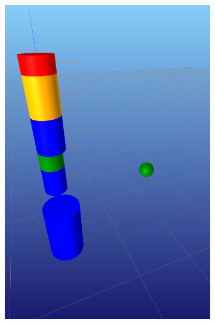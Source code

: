 \documentclass[conference]{IEEEtran}
\begin{document}
\begin{figure}[t]
    \centering
    \begin{subfigure}{0.48\columnwidth}
        \includegraphics[width=\textwidth]{figs/arm_start.png} 
    \end{subfigure}
    \begin{subfigure}{0.48\columnwidth}

\end{subfigure}
\end{figure}
\end{document}
